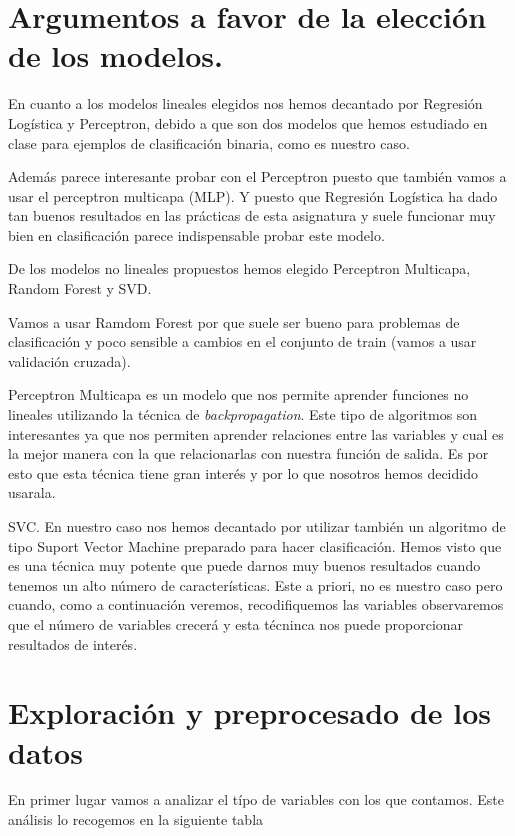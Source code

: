 \documentclass[11pt]{article}
\begin{document}
\section{Argumentos a favor de la elección de los modelos.}

En cuanto a los modelos lineales elegidos nos hemos decantado por Regresión
Logística y Perceptron, debido a que son dos modelos que hemos estudiado en
clase para ejemplos de clasificación binaria, como es nuestro caso.  

Además parece interesante probar con el Perceptron puesto que también vamos a
usar el perceptron multicapa (MLP). Y puesto que Regresión Logística ha dado tan
buenos resultados en las prácticas de esta asignatura y suele funcionar muy bien
en clasificación parece indispensable probar este modelo.

De los modelos no lineales propuestos hemos elegido Perceptron Multicapa, Random
Forest y SVD.

Vamos a usar Ramdom Forest por que suele ser bueno para problemas de clasificación
y poco sensible a cambios en el conjunto de train (vamos a usar
validación cruzada).

Perceptron Multicapa es un modelo que nos permite aprender funciones no lineales
utilizando la técnica de \textit{backpropagation}. Este tipo de algoritmos son
interesantes ya que nos permiten aprender relaciones entre las variables y cual
es la mejor manera con la que relacionarlas con nuestra función de salida. Es
por esto que esta técnica tiene gran interés y por lo que nosotros hemos
decidido usarala.

SVC. En nuestro caso nos hemos decantado por utilizar también un algoritmo de tipo
Suport Vector Machine preparado para hacer clasificación. Hemos visto que es una 
técnica muy potente que puede darnos muy buenos resultados cuando tenemos un alto 
número de características. Este a priori, no es nuestro caso pero cuando, como a 
continuación veremos, recodifiquemos las variables observaremos que el número 
de variables crecerá y esta técninca nos puede proporcionar resultados de interés.

\section{Exploración y preprocesado de los datos}

En primer lugar vamos a analizar el típo de variables con los que contamos. Este
análisis lo recogemos en la siguiente tabla
\end{document}
